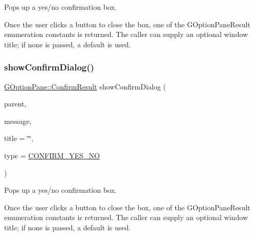 Pops up a yes/no confirmation box. 

Once the user clicks a button to close the box, one of the G\+Option\+Pane\+Result enumeration constants is returned. The caller can supply an optional window title; if none is passed, a default is used. \mbox{\label{classsgl_1_1GOptionPane_a25726b3ff4882c3a7ef9be5fd4c4f2ef}} 
\subsubsection{\texorpdfstring{show\+Confirm\+Dialog()}{showConfirmDialog()}\hspace{0.1cm}{\footnotesize\ttfamily [3/3]}}
{\footnotesize\ttfamily \mbox{\hyperlink{classsgl_1_1GOptionPane_a1cc9e8685029e39646671ed71f32d47d}{G\+Option\+Pane\+::\+Confirm\+Result}} show\+Confirm\+Dialog (\begin{DoxyParamCaption}\item[{Q\+Widget $\ast$}]{parent,  }\item[{const std\+::string \&}]{message,  }\item[{const std\+::string \&}]{title = {\ttfamily \char`\"{}\char`\"{}},  }\item[{\mbox{\hyperlink{classsgl_1_1GOptionPane_a6a1aaf19c06f5a6bef89ea6415547049}{Confirm\+Type}}}]{type = {\ttfamily \mbox{\hyperlink{classsgl_1_1GOptionPane_a6a1aaf19c06f5a6bef89ea6415547049a964914d27eb73a202938a53f43adc4b1}{C\+O\+N\+F\+I\+R\+M\+\_\+\+Y\+E\+S\+\_\+\+NO}}} }\end{DoxyParamCaption})\hspace{0.3cm}{\ttfamily [static]}}



Pops up a yes/no confirmation box. 

Once the user clicks a button to close the box, one of the G\+Option\+Pane\+Result enumeration constants is returned. The caller can supply an optional window title; if none is passed, a default is used. \mbox{\label{classsgl_1_1GOptionPane_a50fdc381453e6b8c495e3f9fe07b7bec}} 
